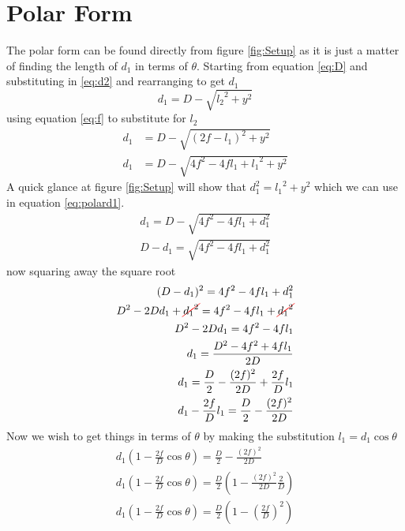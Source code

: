 \documentclass[a5paper,12pt]{article}
\begin{document}
\section{Polar Form}
The polar form can be found directly from figure \ref{fig:Setup} as it is just a matter of finding the length of $d_1$ in terms of $\theta$.
Starting from equation \ref{eq:D} and substituting in \ref{eq:d2} and rearranging to get $d_1$
\begin{equation}
d_1=D-\sqrt{{l_2}^2+y^2} 
\end{equation}
using equation \ref{eq:f} to substitute for $l_2$
\begin{subequations}
\begin{align}
d_1&=D-\sqrt{(2f-l_1)^2+y^2} \\
d_1&=D-\sqrt{4f^2 - 4fl_1 + {l_1}^2+y^2}  \label{eq:polard1}
\end{align}
\end{subequations}
A quick glance at figure \ref{fig:Setup} will show that $d_1^2={l_1}^2 + y ^2$ which we can use in equation \ref{eq:polard1}.
\begin{subequations}
\begin{align}
d_1=D-\sqrt{4f^2 - 4fl_1 + d_1^2 }\\
D-d_1=\sqrt{4f^2 - 4fl_1 + d_1^2 }
\end{align}
\end{subequations}
now squaring away the square root
\begin{subequations}
\begin{align}
(D-d_1)^2=4f^2 - 4fl_1 + d_1^2 \\
D^2-2Dd_1+\Ccancel[red]{{d_1}^2}=4f^2 - 4fl_1 + \Ccancel[red]{{d_1}^2}\\
D^2-2Dd_1=4f^2 - 4fl_1\\
d_1=\frac{D^2-4f^2 +  4fl_1}{2D} \\
d_1=\frac{D}{2}-\frac{(2f)^2}{2D} +  \frac{2f}{D}l_1\\
d_1-  \frac{2f}{D}l_1=\frac{D}{2}-\frac{(2f)^2}{2D} 
\end{align}
\end{subequations}
Now we wish to get things in terms of $\theta$ by making the substitution $l_1=d_1 \cos \theta$
\begin{subequations}
\begin{align}
d_1\left(1-  \frac{2f}{D}\cos \theta \right)=\frac{D}{2}-\frac{(2f)^2}{2D} \\
d_1\left(1-  \frac{2f}{D}\cos \theta \right)=\frac{D}{2}\left(1-\frac{(2f)^2}{2D}\frac{2}{D}\right) \\
d_1\left(1-  \frac{2f}{D}\cos \theta \right)=\frac{D}{2}\left(1-\left(\frac{2f}{D}\right)^2\right)
\end{align}
\end{subequations}
\end{document}

